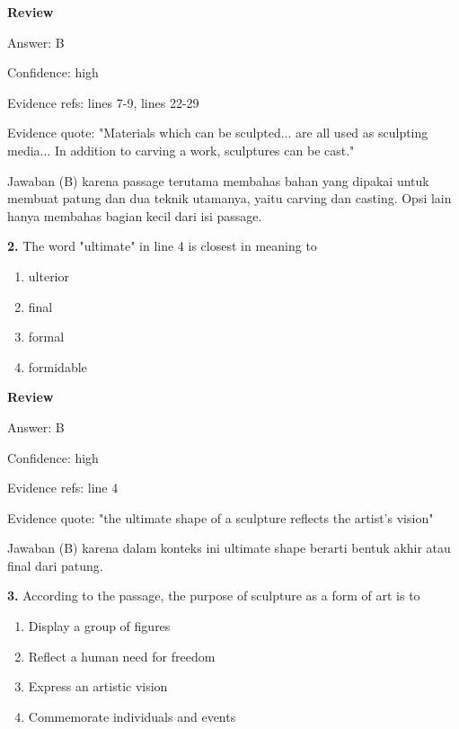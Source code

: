 \documentclass[12pt]{article}
\begin{document}
\textbf{Review}\par
Answer: B\par
Confidence: high\par
Evidence refs: lines 7-9, lines 22-29\par
Evidence quote: "Materials which can be sculpted... are all used as sculpting media... In addition to carving a work, sculptures can be cast."\par
Jawaban (B) karena passage terutama membahas bahan yang dipakai untuk membuat patung dan dua teknik utamanya, yaitu carving dan casting. Opsi lain hanya membahas bagian kecil dari isi passage.\par
\endgroup
\par
\vspace{0.25\baselineskip}
\noindent\textbf{2.} The word "ultimate" in line 4 is closest in meaning to
\begin{enumerate}[label=(\Alph*),leftmargin=*,itemsep=0.2em]
\item ulterior
\item final
\item formal
\item formidable
\end{enumerate}
\par
\begingroup
\setlength{\parskip}{0pt}
\setlength{\parindent}{0pt}
\textbf{Review}\par
Answer: B\par
Confidence: high\par
Evidence refs: line 4\par
Evidence quote: "the ultimate shape of a sculpture reflects the artist's vision"\par
Jawaban (B) karena dalam konteks ini ultimate shape berarti bentuk akhir atau final dari patung.\par
\endgroup
\par
\vspace{0.25\baselineskip}
\noindent\textbf{3.} According to the passage, the purpose of sculpture as a form of art is to
\begin{enumerate}[label=(\Alph*),leftmargin=*,itemsep=0.2em]
\item Display a group of figures
\item Reflect a human need for freedom
\item Express an artistic vision
\item Commemorate individuals and events
\end{enumerate}
\par
\begingroup
\end{document}
